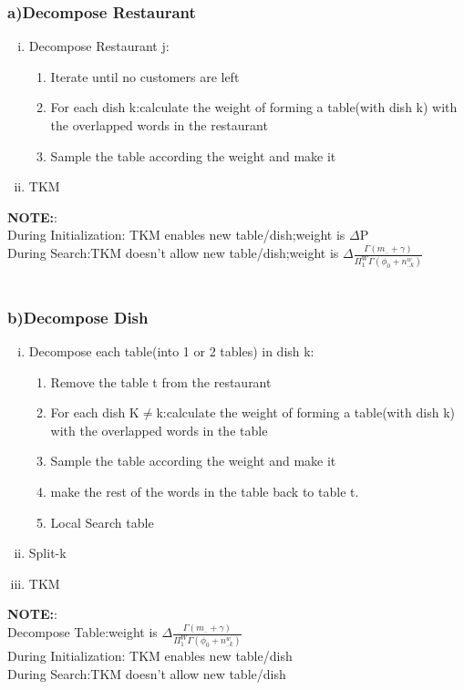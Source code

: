 \documentclass{article}
\begin{document}
\begin{spacing}{1.1}
\subsubsection{a)Decompose Restaurant}
\begin{enumerate}[(i)]
\item Decompose Restaurant j:
\begin{enumerate}
\item Iterate until no customers are left 
\item For each dish k:calculate the weight of forming a table(with dish k) with the overlapped words in the restaurant  
\item Sample the table according the weight and make it 
\end{enumerate}
\item TKM
\end{enumerate}
{\bf NOTE:}:\\
During Initialization: TKM enables new table/dish;weight is $\Delta$P\\
During Search:TKM doesn't allow new table/dish;weight is $\Delta\frac{\Gamma(m_{..}+\gamma)}{\Pi_{1}^{W}\Gamma(\phi_{0}+n_{..k}^{w})}$\\\\

\subsubsection{b)Decompose Dish}
\begin{enumerate}[(i)]
\item Decompose each table(into 1 or 2 tables) in dish k:
\begin{enumerate}
\item Remove the table t from the restaurant
\item For each dish K$\neq$k:calculate the weight of forming a table(with dish k) with the overlapped words in the table   
\item Sample the table according the weight and make it 
\item make the rest of the words in the table back to table t.
\item Local Search table
\end{enumerate}
\item Split-k
\item TKM
\end{enumerate}
{\bf NOTE:}:\\
Decompose Table:weight is $\Delta\frac{\Gamma(m_{..}+\gamma)}{\Pi_{1}^{W}\Gamma(\phi_{0}+n_{..k}^{w})}$\\
During Initialization: TKM enables new table/dish\\
During Search:TKM doesn't allow new table/dish\\


\end{spacing}
\end{document}
